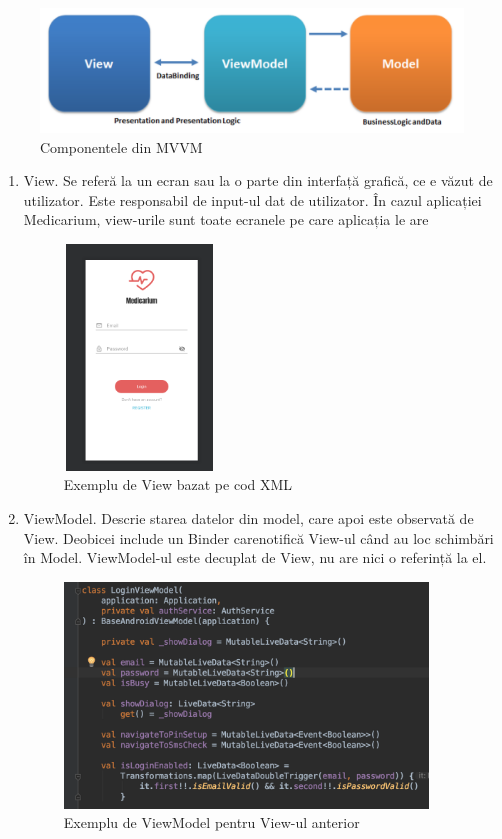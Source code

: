 \documentclass[12pt]{article}
\begin{document}
\begin{figure}[H]
\centering
\includegraphics[width=12cm]{mvvm.png}
\caption{Componentele din MVVM \nocite{mvvmpng}}
\end{figure}

\begin{enumerate}
    \item View. Se referă la un ecran sau la o parte din interfață grafică,
    ce e văzut de utilizator. Este responsabil de input-ul dat de utilizator. În cazul aplicației
    Medicarium, view-urile sunt toate ecranele pe care aplicația le are

    \begin{figure}[H]
    \centering
    \includegraphics[width=4cm, height=6cm]{view.png}
    \caption{Exemplu de View bazat pe cod XML}
    \end{figure}

    \item ViewModel. Descrie starea datelor din model, care apoi este observată de
    View. Deobicei include un Binder carenotifică View-ul când au loc schimbări în Model.
    ViewModel-ul este decuplat de View, nu are nici o referință la el.

    \begin{figure}[H]
    \centering
    \includegraphics[height=6cm]{viewModel.png}
    \caption{Exemplu de ViewModel pentru View-ul anterior}
    \end{figure}
    

\end{enumerate}
\end{document}
